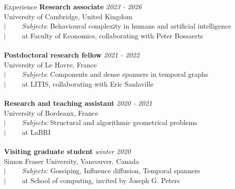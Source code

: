 \documentclass[french]{resume} %
\begin{document}
	\begin{rSection}{Experience}
		{\bf Research associate} \hfill {\em 2023 - 2026} 
		\\ University of Cambridge, United Kingdom
		\\ $| \qquad$ \textit{Subjects}: Behavioural complexity in humans and artificial intelligence
		\\ $| \qquad$ at Faculty of Economics, collaborating with Peter Bossaerts
		\\
		\\ {\bf Postdoctoral research fellow} \hfill {\em 2021 - 2022} 
		\\ University of Le Havre, France
		\\ $| \qquad$ \textit{Subjects}: Components and dense spanners in temporal graphs
		\\ $| \qquad$ at LITIS, collaborating with Eric Sanlaville
		\\
		\\ {\bf Research and teaching assistant} \hfill {\em 2020 - 2021} 
		\\ University of Bordeaux, France
		\\ $| \qquad$ \textit{Subjects}: Structural and algorithmic geometrical problems
		\\ $| \qquad$ at LaBRI
		\\ \\
		{\bf Visiting graduate student} \hfill {\em winter 2020}
		\\ Simon Fraser University, Vancouver, Canada
		\\ $| \qquad$ \textit{Subjects:} Gossiping, Influence diffusion, Temporal spanners
		\\ $| \qquad$ at School of computing, invited by Joseph G. Peters
	\end{rSection}
	
\end{document}
